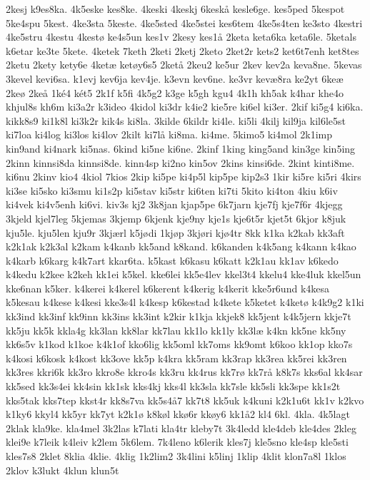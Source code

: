 {2kesj
k9es8ka.
4k5eske
kes8ke.
4keski
4keskj
6keskå
kesle6ge.
kes5ped
5kespot
5ke4spu
5kest.
4ke3sta
5keste.
4ke5sted
4ke5stei
kes6tem
4ke5s4ten
ke3sto
4kestri
4ke5stru
4kestu
4kestø
ke4s5un
kes1v
2kesy
kes1å
2keta
keta6ka
keta6le.
5ketals
k6etar
ke3te
5kete.
4ketek
7keth
2keti
2ketj
2keto
2ket2r
kets2
ket6t7enh
ket8tes
2ketu
2kety
kety6e
4ketæ
ketøy6s5
2ketå
2keu2
ke5ur
2kev
kev2a
keva8ne.
5kevas
3kevel
kevi6sa.
k1evj
kev6ja
kev4je.
k3evn
kev6ne.
ke3vr
kevæ8ra
ke2yt
6keæ
2keø
2keå
1ké4
két5
2k1f
k5fi
4k5g2
k3ge
k5gh
kgu4
4k1h
kh5ak
k4har
khe4o
khjul8s
kh6m
ki3a2r
k3ideo
4kidol
ki3dr
k4ie2
kie5re
ki6el
ki3er.
2kif
ki5g4
ki6ka.
kikk8s9
ki1k8l
ki3k2r
kik4s
ki8la.
3kilde
6kildr
ki4le.
ki5li
4kilj
kil9ja
kil6le5st
ki7loa
ki4log
ki3los
ki4lov
2kilt
ki7lå
ki8ma.
ki4me.
5kimo5
ki4mol
2k1imp
kin9and
ki4nark
ki5nas.
6kind
ki5ne
ki6ne.
2kinf
1king
king5and
kin3ge
kin5ing
2kinn
kinnsi8da
kinnsi8de.
kinn4sp
ki2no
kin5ov
2kins
kinsi6de.
2kint
kinti8me.
ki6nu
2kinv
kio4
4kiol
7kios
2kip
ki5pe
ki4p5l
kip5pe
kip2s3
1kir
ki5re
ki5ri
4kirs
ki3se
ki5sko
ki3smu
ki1s2p
ki5stav
ki5str
ki6ten
ki7ti
5kito
ki4ton
4kiu
k6iv
ki4vek
ki4v5enh
ki6vi.
kiv3s
kj2
3k8jan
kjap5pe
6k7jarn
kje7fj
kje7f6r
4kjegg
3kjeld
kjel7leg
5kjemas
3kjemp
6kjenk
kje9ny
kje1s
kje6t5r
kjet5t
6kjor
k8juk
kju5le.
kju5len
kju9r
3kjærl
k5jødi
1kjøp
3kjøri
kjø4tr
8kk
k1ka
k2kab
kk3aft
k2k1ak
k2k3al
k2kam
k4kanb
kk5and
k8kand.
k6kanden
k4k5ang
k4kann
k4kao
k4karb
k6karg
k4k7art
kkar6ta.
k5kast
k6kasu
k6katt
k2k1au
kk1av
k6kedo
k4kedu
k2kee
k2keh
kk1ei
k5kel.
kke6lei
kk5e4lev
kkel3t4
kkelu4
kke4luk
kkel5un
kke6nan
k5ker.
k4kerei
k4kerel
k6kerent
k4kerig
k4kerit
kke5r6und
k4kesa
k5kesau
k4kese
k4kesi
kke3s4l
k4kesp
k6kestad
k4kete
k5ketet
k4ketø
k4k9g2
k1ki
kk3ind
kk3inf
kk9inn
kk3ins
kk3int
k2kir
k1kja
kkjek8
kk5jent
k4k5jern
kkje7t
kk5ju
kk5k
kkla4g
kk3lan
kk8lar
kk7lau
kk1lo
kk1ly
kk3læ
k4kn
kk5ne
kk5ny
kk6s5v
k1kod
k1koe
k4k1of
kko6lig
kk5oml
kk7oms
kk9omt
k6koo
kk1op
kko7s
k4kosi
k6kosk
k4kost
kk3ove
kk5p
k4kra
kk5ram
kk3rap
kk3rea
kk5rei
kk3ren
kk3res
kkri6k
kk3ro
kkro8e
kkro4s
kk3ru
kk4rus
kk7rø
kk7rå
k8k7s
kks6al
kk4sar
kk5sed
kk3s4ei
kk4sin
kk1sk
kks4kj
kks4l
kk3sla
kk7sle
kk5sli
kk3spe
kk1s2t
kks5tak
kks7tep
kkst4r
kk8s7va
kk5s4å7
kk7t8
kk5uk
k4kuni
k2k1u6t
kk1v
k2kvo
k1ky6
kkyl4
kk5yr
kk7yt
k2k1ø
k8køl
kkø6r
kkøy6
kk1å2
kl4
6kl.
4kla.
4k5lagt
2klak
kla9ke.
kla4mel
3k2las
k7lati
kla4tr
kleby7t
3k4ledd
kle4deb
kle4des
2kleg
klei9e
k7leik
k4leiv
k2lem
5k6lem.
7k4leno
k6lerik
kles7j
kle5sno
kle4sp
kle5sti
kles7s8
2klet
8klia
4klie.
4klig
1k2lim2
3k4lini
k5linj
1klip
4klit
klon7a8l
1klos
2klov
k3lukt
4klun
klun5t
}
